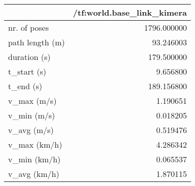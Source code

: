 \begin{tabular}{lr}
\toprule
{} &  /tf:world.base\_link\_kimera \\
\midrule
nr. of poses    &                 1796.000000 \\
path length (m) &                   93.246003 \\
duration (s)    &                  179.500000 \\
t\_start (s)     &                    9.656800 \\
t\_end (s)       &                  189.156800 \\
v\_max (m/s)     &                    1.190651 \\
v\_min (m/s)     &                    0.018205 \\
v\_avg (m/s)     &                    0.519476 \\
v\_max (km/h)    &                    4.286342 \\
v\_min (km/h)    &                    0.065537 \\
v\_avg (km/h)    &                    1.870115 \\
\bottomrule
\end{tabular}
